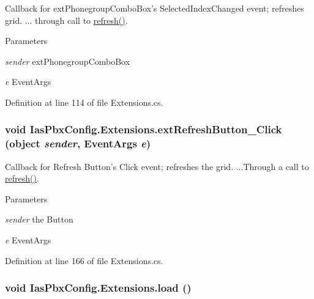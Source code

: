 Callback for extPhonegroupComboBox's SelectedIndexChanged event; refreshes grid. ... through call to \hyperlink{class_ias_pbx_config_1_1_extensions_a701d940ae6c6d38e9bc691af071d091b}{refresh()}. 
\begin{DoxyParams}{Parameters}
\item[{\em sender}]extPhonegroupComboBox \item[{\em e}]EventArgs \end{DoxyParams}


Definition at line 114 of file Extensions.cs.\hypertarget{class_ias_pbx_config_1_1_extensions_a78b63b607c0f699aa7f647821e6643ed}{
\subsubsection[{extRefreshButton\_\-Click}]{\setlength{\rightskip}{0pt plus 5cm}void IasPbxConfig.Extensions.extRefreshButton\_\-Click (object {\em sender}, \/  EventArgs {\em e})}}
\label{class_ias_pbx_config_1_1_extensions_a78b63b607c0f699aa7f647821e6643ed}


Callback for Refresh Button's Click event; refreshes the grid. ...Through a call to \hyperlink{class_ias_pbx_config_1_1_extensions_a701d940ae6c6d38e9bc691af071d091b}{refresh()}. 
\begin{DoxyParams}{Parameters}
\item[{\em sender}]the Button \item[{\em e}]EventArgs \end{DoxyParams}


Definition at line 166 of file Extensions.cs.\hypertarget{class_ias_pbx_config_1_1_extensions_ae4bb3f156ed11b990645abf3ec68e168}{
\subsubsection[{load}]{\setlength{\rightskip}{0pt plus 5cm}void IasPbxConfig.Extensions.load ()}}
\label{class_ias_pbx_config_1_1_extensions_ae4bb3f156ed11b990645abf3ec68e168}


